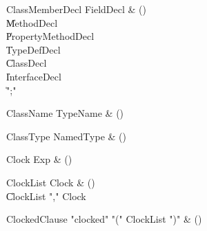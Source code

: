 \begin{bbgrammar}

ClassMemberDecl \label{prod:ClassMemberDecl}  \: FieldDecl & () \\

    \| MethodDecl \\
    \| PropertyMethodDecl \\
    \| TypeDefDecl \\
    \| ClassDecl \\
    \| InterfaceDecl \\
    \| \xcd";" \\

\end{bbgrammar}

\begin{bbgrammar}

ClassName \label{prod:ClassName}  \: TypeName & () \\


\end{bbgrammar}

\begin{bbgrammar}

ClassType \label{prod:ClassType}  \: NamedType & () \\


\end{bbgrammar}

\begin{bbgrammar}

Clock \label{prod:Clock}  \: Exp & () \\


\end{bbgrammar}

\begin{bbgrammar}

ClockList \label{prod:ClockList}  \: Clock & () \\

    \| ClockList \xcd"," Clock \\

\end{bbgrammar}

\begin{bbgrammar}

ClockedClause \label{prod:ClockedClause}  \: \xcd"clocked" \xcd"(" ClockList \xcd")" & () \\


\end{bbgrammar}

